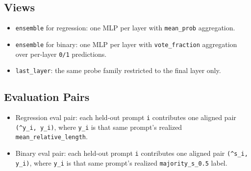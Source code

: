 \documentclass[11pt]{article}
\begin{document}
\subsection*{Views}
\begin{itemize}[leftmargin=1.5em]
\item \texttt{ensemble} for regression: one MLP per layer with \texttt{mean\_prob} aggregation.
\item \texttt{ensemble} for binary: one MLP per layer with \texttt{vote\_fraction} aggregation over per-layer \texttt{0/1} predictions.
\item \texttt{last\_layer}: the same probe family restricted to the final layer only.
\end{itemize}

\subsection*{Evaluation Pairs}
\begin{itemize}[leftmargin=1.5em]
\item Regression eval pair: each held-out prompt \texttt{i} contributes one aligned pair \texttt{(\^{}y\_i, y\_i)}, where \texttt{y\_i} is that same prompt's realized \texttt{mean\_relative\_length}.
\item Binary eval pair: each held-out prompt \texttt{i} contributes one aligned pair \texttt{(\^{}s\_i, y\_i)}, where \texttt{y\_i} is that same prompt's realized \texttt{majority\_s\_0.5} label.
\end{itemize}
\end{document}
